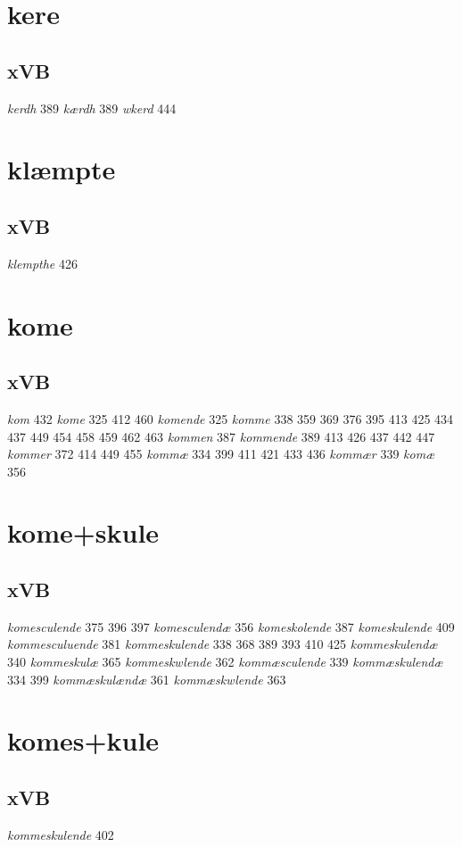 \documentclass[a4paper,twocolumn]{article}
\begin{document}
\section{kere}
\label{sec:orge426930}
\subsection{xVB}
\label{sec:org12a7d45}
\emph{kerdh} 389 \emph{kærdh} 389 \emph{wkerd} 444 
\section{klæmpte}
\label{sec:org8532bb1}
\subsection{xVB}
\label{sec:orgebd288c}
\emph{klempthe} 426 
\section{kome}
\label{sec:org282f857}
\subsection{xVB}
\label{sec:org4f88f03}
\emph{kom} 432 \emph{kome} 325 412 460 \emph{komende} 325 \emph{komme} 338 359 369 376 395 413 425 434 437 449 454 458 459 462 463 \emph{kommen} 387 \emph{kommende} 389 413 426 437 442 447 \emph{kommer} 372 414 449 455 \emph{kommæ} 334 399 411 421 433 436 \emph{kommær} 339 \emph{komæ} 356 
\section{kome+skule}
\label{sec:org32e9f68}
\subsection{xVB}
\label{sec:org0609f5d}
\emph{komesculende} 375 396 397 \emph{komesculendæ} 356 \emph{komeskolende} 387 \emph{komeskulende} 409 \emph{kommesculuende} 381 \emph{kommeskulende} 338 368 389 393 410 425 \emph{kommeskulendæ} 340 \emph{kommeskulæ} 365 \emph{kommeskwlende} 362 \emph{kommæsculende} 339 \emph{kommæskulendæ} 334 399 \emph{kommæskulændæ} 361 \emph{kommæskwlende} 363 
\section{komes+kule}
\label{sec:orgbb3c9f1}
\subsection{xVB}
\label{sec:org2ef3e84}
\emph{kommeskulende} 402 
\end{document}
